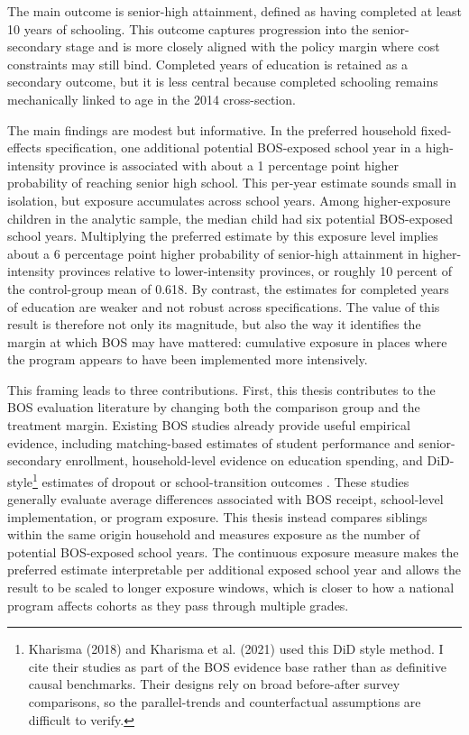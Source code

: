 \documentclass[a4paper, 12pt]{article}
\begin{document}
\begin{doublespacing}
The main outcome is senior-high attainment, defined as having completed at least 10 years of schooling. This outcome captures progression into the senior-secondary stage and is more closely aligned with the policy margin where cost constraints may still bind. Completed years of education is retained as a secondary outcome, but it is less central because completed schooling remains mechanically linked to age in the 2014 cross-section.

The main findings are modest but informative. In the preferred household fixed-effects specification, one additional potential BOS-exposed school year in a high-intensity province is associated with about a 1 percentage point higher probability of reaching senior high school. This per-year estimate sounds small in isolation, but exposure accumulates across school years. Among higher-exposure children in the analytic sample, the median child had six potential BOS-exposed school years. Multiplying the preferred estimate by this exposure level implies about a 6 percentage point higher probability of senior-high attainment in higher-intensity provinces relative to lower-intensity provinces, or roughly 10 percent of the control-group mean of 0.618. By contrast, the estimates for completed years of education are weaker and not robust across specifications. The value of this result is therefore not only its magnitude, but also the way it identifies the margin at which BOS may have mattered: cumulative exposure in places where the program appears to have been implemented more intensively.

This framing leads to three contributions. First, this thesis contributes to the BOS evaluation literature by changing both the comparison group and the treatment margin. Existing BOS studies already provide useful empirical evidence, including matching-based estimates of student performance and senior-secondary enrollment, household-level evidence on education spending, and DiD-style\footnote{Kharisma (2018) and Kharisma et al. (2021) used this DiD style method. I cite their studies as part of the BOS evidence base rather than as definitive causal benchmarks. Their designs rely on broad before-after survey comparisons, so the parallel-trends and counterfactual assumptions are difficult to verify.} estimates of dropout or school-transition outcomes \citep{Sulistyaningrum2016,SariTanaka2019,KartasasmitaSulistyaningrum2021,Kharisma2018,KharismaRemiMaharani2021}. These studies generally evaluate average differences associated with BOS receipt, school-level implementation, or program exposure. This thesis instead compares siblings within the same origin household and measures exposure as the number of potential BOS-exposed school years. The continuous exposure measure makes the preferred estimate interpretable per additional exposed school year and allows the result to be scaled to longer exposure windows, which is closer to how a national program affects cohorts as they pass through multiple grades.


\end{doublespacing}
\end{document}
